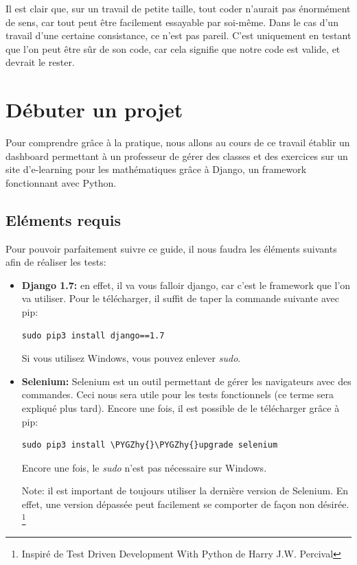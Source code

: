 \documentclass[letterpaper,10pt,french]{sphinxmanual}
\def\PYGZhy{\char`\-}
\begin{document}
Il est clair que, sur un travail de petite taille, tout coder n'aurait pas
énormément de sens, car tout peut être facilement essayable par soi-même.
Dans le cas d'un travail d'une certaine consistance, ce n'est pas pareil.
C'est uniquement en testant que l'on peut être sûr de son code, car cela
signifie que notre code est valide, et devrait le rester.


\chapter{Débuter un projet}
\label{projet1:debuter-un-projet}\label{projet1::doc}
Pour comprendre grâce à la pratique, nous allons au cours de ce travail établir
un dashboard permettant à un professeur de gérer des classes et des exercices
sur un site d'e-learning pour les mathématiques grâce à Django, un framework
fonctionnant avec Python.


\section{Eléments requis}
\label{projet1:elements-requis}
Pour pouvoir parfaitement suivre ce guide, il nous faudra les éléments suivants
afin de réaliser les tests:
\begin{itemize}
\item {} 
\textbf{Django 1.7:} en effet, il va vous falloir django, car c'est le framework
que l'on va utiliser. Pour le télécharger, il suffit de taper la commande
suivante avec pip:

\begin{Verbatim}[commandchars=\\\{\}]
sudo pip3 install django==1.7
\end{Verbatim}

Si vous utilisez Windows, vous pouvez enlever \emph{sudo}.

\item {} 
\textbf{Selenium:} Selenium est un outil permettant de gérer les navigateurs
avec des commandes. Ceci nous sera utile pour les tests fonctionnels (ce
terme sera expliqué plus tard). Encore une fois, il est possible de le
télécharger grâce à pip:

\begin{Verbatim}[commandchars=\\\{\}]
sudo pip3 install \PYGZhy{}\PYGZhy{}upgrade selenium
\end{Verbatim}

Encore une fois, le \emph{sudo} n'est pas nécessaire sur Windows.

Note: il est important de toujours utiliser la dernière version de Selenium.
En effet, une version dépassée peut facilement se comporter de façon non
désirée. \footnote{
Inspiré de Test Driven Development With Python de Harry J.W. Percival
}

\end{itemize}
\end{document}
